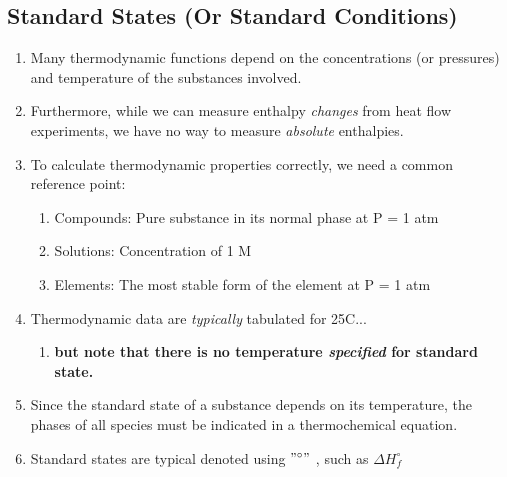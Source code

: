 \documentclass[../CHEM152Notes.tex]{subfiles}
\begin{document}
\subsection*{Standard States (Or Standard Conditions)}
\begin{enumerate}
    \item Many thermodynamic functions depend on the concentrations (or pressures) and temperature of the substances involved.
    \item Furthermore, while we can measure enthalpy \emph{changes} from heat flow experiments, we have no way to measure \emph{absolute} enthalpies.
    \item To calculate thermodynamic properties correctly, we need a common reference point:
        \begin{enumerate}
            \item Compounds: Pure substance in its normal phase at P = 1 atm
            \item Solutions: Concentration of 1 M
            \item Elements: The most stable form of the element at P = 1 atm
        \end{enumerate}
    \item Thermodynamic data are \emph{typically} tabulated for 25C... 
        \begin{enumerate}
            \item \textbf{but note that there is no temperature \emph{specified} for standard state.}
        \end{enumerate}
    \item Since the standard state of a substance depends on its temperature, the phases of all species must be indicated in a thermochemical equation.
    \item Standard states are typical denoted using $"^\circ"$ , such as $\Delta H^\circ_f$
\end{enumerate}
\end{document}
